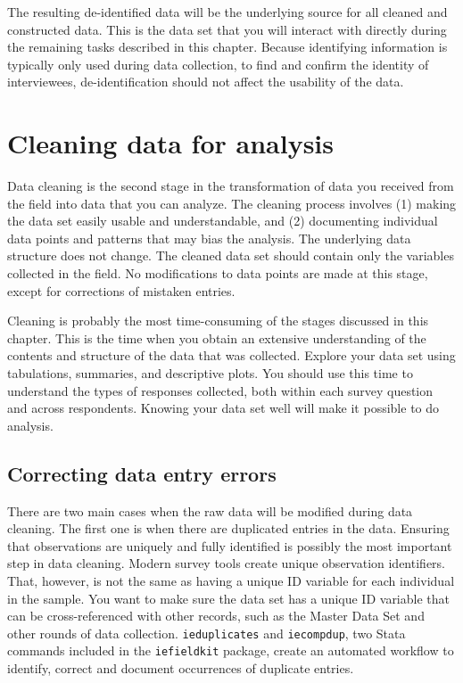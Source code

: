 The resulting de-identified data will be the underlying source for all cleaned and constructed data.
This is the data set that you will interact with directly during the remaining tasks described in this chapter.
Because identifying information is typically only used during data collection,
to find and confirm the identity of interviewees,
de-identification should not affect the usability of the data.


\section{Cleaning data for analysis}

Data cleaning is the second stage in the transformation of data you received from the field into data that you can analyze.
The cleaning process involves (1) making the data set easily usable and understandable,
and (2) documenting individual data points and patterns that may bias the analysis.
The underlying data structure does not change.
The cleaned data set should contain only the variables collected in the field.
No modifications to data points are made at this stage, except for corrections of mistaken entries.

Cleaning is probably the most time-consuming of the stages discussed in this chapter.
This is the time when you obtain an extensive understanding of the contents and structure of the data that was collected.
Explore your data set using tabulations, summaries, and descriptive plots.
You should use this time to understand the types of responses collected, both within each survey question and across respondents.
Knowing your data set well will make it possible to do analysis.

\subsection{Correcting data entry errors}

There are two main cases when the raw data will be modified during data cleaning.
The first one is when there are duplicated entries in the data.
Ensuring that observations are uniquely and fully identified
is possibly the most important step in data cleaning.
Modern survey tools create unique observation identifiers.
That, however, is not the same as having a unique ID variable for each individual in the sample.
You want to make sure the data set has a unique ID variable
that can be cross-referenced with other records, such as the Master Data Set
and other rounds of data collection.
\texttt{ieduplicates} and \texttt{iecompdup},
two Stata commands included in the \texttt{iefieldkit}
package,
create an automated workflow to identify, correct and document
occurrences of duplicate entries.

